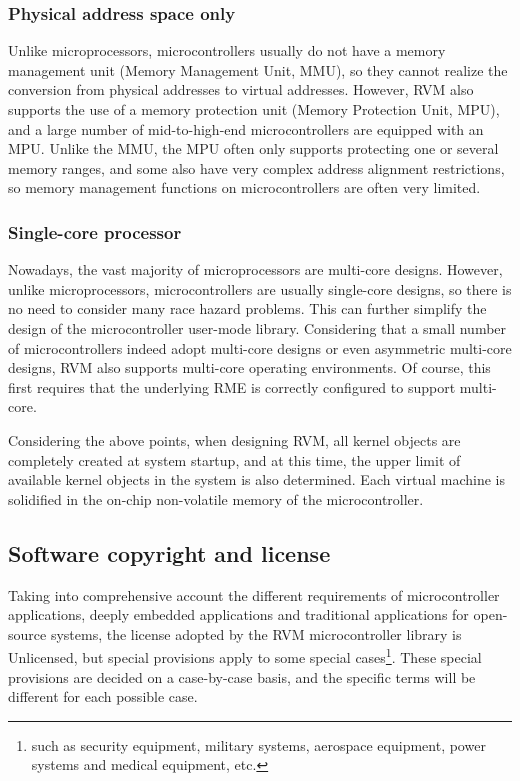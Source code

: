 \subsubsection{Physical address space only}\label{subsubsec:1-1-1-5}

Unlike microprocessors, microcontrollers usually do not have a memory management
unit (Memory Management
Unit, MMU), so they cannot realize the conversion from physical addresses to virtual addresses. However, RVM also supports the use of a memory
protection
unit (Memory
Protection
Unit, MPU), and a large number of mid-to-high-end microcontrollers are equipped with an MPU. Unlike the MMU, the MPU often only supports protecting one or several memory ranges, and some also have very complex address alignment restrictions, so memory management functions on microcontrollers are often very limited.

\subsubsection{Single-core processor}\label{subsubsec:1-1-1-6}

Nowadays, the vast majority of microprocessors are multi-core designs. However, unlike microprocessors, microcontrollers are usually single-core designs, so there is no need to consider many race hazard problems. This can further simplify the design of the microcontroller user-mode library. Considering that a small number of microcontrollers indeed adopt multi-core designs or even asymmetric multi-core designs, RVM also supports multi-core operating environments. Of course, this first requires that the underlying RME is correctly configured to support multi-core.

Considering the above points, when designing RVM, all kernel objects are completely created at system startup, and at this time, the upper limit of available kernel objects in the system is also determined. Each virtual machine is solidified in the on-chip non-volatile memory of the microcontroller.

\subsection{Software copyright and license}\label{subsec:1-1-2}

Taking into comprehensive account the different requirements of microcontroller applications, deeply embedded applications and traditional applications for open-source systems, the license adopted by the RVM microcontroller library is Unlicensed, but special provisions apply to some special cases\footnote{such as security equipment, military systems, aerospace equipment, power systems and medical equipment, etc.}. These special provisions are decided on a case-by-case basis, and the specific terms will be different for each possible case.


